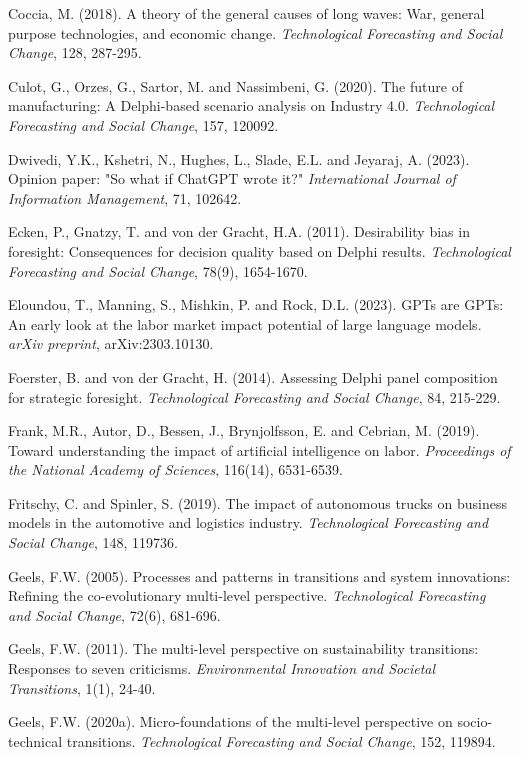 \documentclass{article}
\begin{document}
Coccia, M. (2018). A theory of the general causes of long waves: War, general purpose technologies, and economic change. \textit{Technological Forecasting and Social Change}, 128, 287-295.

Culot, G., Orzes, G., Sartor, M. and Nassimbeni, G. (2020). The future of manufacturing: A Delphi-based scenario analysis on Industry 4.0. \textit{Technological Forecasting and Social Change}, 157, 120092.

Dwivedi, Y.K., Kshetri, N., Hughes, L., Slade, E.L. and Jeyaraj, A. (2023). Opinion paper: "So what if ChatGPT wrote it?" \textit{International Journal of Information Management}, 71, 102642.

Ecken, P., Gnatzy, T. and von der Gracht, H.A. (2011). Desirability bias in foresight: Consequences for decision quality based on Delphi results. \textit{Technological Forecasting and Social Change}, 78(9), 1654-1670.

Eloundou, T., Manning, S., Mishkin, P. and Rock, D.L. (2023). GPTs are GPTs: An early look at the labor market impact potential of large language models. \textit{arXiv preprint}, arXiv:2303.10130.

Foerster, B. and von der Gracht, H. (2014). Assessing Delphi panel composition for strategic foresight. \textit{Technological Forecasting and Social Change}, 84, 215-229.

Frank, M.R., Autor, D., Bessen, J., Brynjolfsson, E. and Cebrian, M. (2019). Toward understanding the impact of artificial intelligence on labor. \textit{Proceedings of the National Academy of Sciences}, 116(14), 6531-6539.

Fritschy, C. and Spinler, S. (2019). The impact of autonomous trucks on business models in the automotive and logistics industry. \textit{Technological Forecasting and Social Change}, 148, 119736.

Geels, F.W. (2005). Processes and patterns in transitions and system innovations: Refining the co-evolutionary multi-level perspective. \textit{Technological Forecasting and Social Change}, 72(6), 681-696.

Geels, F.W. (2011). The multi-level perspective on sustainability transitions: Responses to seven criticisms. \textit{Environmental Innovation and Societal Transitions}, 1(1), 24-40.

Geels, F.W. (2020a). Micro-foundations of the multi-level perspective on socio-technical transitions. \textit{Technological Forecasting and Social Change}, 152, 119894.
\end{document}
